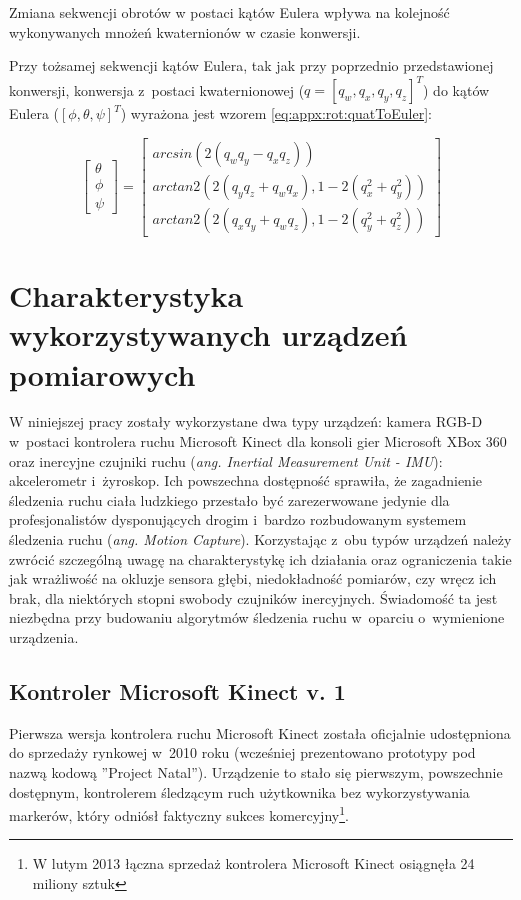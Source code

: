 Zmiana sekwencji obrotów w postaci kątów Eulera	wpływa na kolejność wykonywanych mnożeń kwaternionów w czasie konwersji.

Przy tożsamej sekwencji kątów Eulera, tak jak przy poprzednio przedstawionej konwersji, konwersja z~postaci kwaternionowej ($q = [q_w, q_x, q_y, q_z]^T$) do kątów Eulera ($[\phi, \theta, \psi]^T$) wyrażona jest wzorem \ref{eq:appx:rot:quatToEuler}:
		
\begin{equation}
	\label{eq:appx:rot:quatToEuler}
	\begin{bmatrix}\theta \\ \phi \\ \psi \end{bmatrix} =	
	\begin{bmatrix}                                                   
		arcsin(2(q_w q_y - q_x q_z))                      \\
		arctan2(2(q_y q_z + q_w q_x), 1-2(q_x^2 + q_y^2)) \\
		arctan2(2(q_x q_y + q_w q_z), 1-2(q_y^2 + q_z^2)) 
	\end{bmatrix} 		
\end{equation}
		
																													
\section{Charakterystyka wykorzystywanych urządzeń pomiarowych}\label{chap:characteristics}
W niniejszej pracy zostały wykorzystane dwa typy urządzeń: kamera RGB-D w~postaci kontrolera ruchu Microsoft Kinect dla konsoli gier Microsoft XBox 360 oraz inercyjne czujniki ruchu (\emph{ang. Inertial Measurement Unit - IMU}): akcelerometr i~żyroskop. Ich powszechna dostępność sprawiła, że zagadnienie śledzenia ruchu ciała ludzkiego przestało być zarezerwowane jedynie dla profesjonalistów dysponujących drogim i~bardzo rozbudowanym systemem śledzenia ruchu (\emph{ang. Motion Capture}). Korzystając z~obu typów urządzeń należy zwrócić szczególną uwagę na charakterystykę ich działania oraz ograniczenia takie jak wrażliwość na okluzje sensora głębi, niedokładność pomiarów, czy wręcz ich brak, dla niektórych stopni swobody czujników inercyjnych. Świadomość ta jest niezbędna przy budowaniu algorytmów śledzenia ruchu w~oparciu o~wymienione urządzenia. 
																													
\subsection{Kontroler Microsoft Kinect v. 1}\label{sec:characteristics:kinect}
Pierwsza wersja kontrolera ruchu Microsoft Kinect została oficjalnie udostępniona do sprzedaży rynkowej w~2010 roku (wcześniej prezentowano prototypy pod nazwą kodową ''Project Natal''). Urządzenie to stało się pierwszym, powszechnie dostępnym, kontrolerem śledzącym ruch użytkownika bez wykorzystywania markerów, który odniósł faktyczny sukces komercyjny{\footnote{W lutym 2013 łączna sprzedaż kontrolera Microsoft Kinect osiągnęła 24 miliony sztuk}}.  
																													
